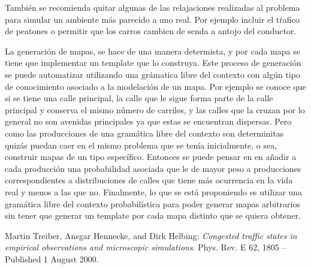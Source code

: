 \documentclass[colorinlistoftodos,twoside,twocolumn]{article} %
\begin{document}
	Tambi\'en se recomienda quitar algunas de las relajaciones realizadas al problema para simular un ambiente m\'as parecido  a uno real. Por ejemplo incluir el t\'rafico de peatones o permitir que los carros cambien de senda a antojo del conductor.
	
La generación de mapas, se hace de una manera determista, y por cada mapa se tiene que implementar un template que lo construya. Este proceso de generación se puede automatizar utilizando una grámatica libre del contexto con algún tipo de conocimiento asociado a la modelación de un mapa. Por ejemplo se conoce que si se tiene una calle principal, la calle que le sigue forma parte de la calle principal y conserva el mismo número de carriles, y las calles que la cruzan por lo general no son avenidas principales ya que estas se encuentran dispersas. Pero como las producciones de una gramática libre del contexto son determinitas quizás puedan caer en el mismo problema que se tenía inicialmente, o sea, construir mapas de un tipo específico. Entonces se puede pensar en en a\~nadir a cada producción una probabilidad asociada que le de mayor peso a producciones correspondientes a distribuciones de calles que tiene m\'as ocurrencia en la vida real y menos a las que no. Finalmente, lo que se está proponiendo es utilizar una gramática libre del contexto probabilística para poder generar mapas arbitrarios sin tener que generar un template por cada mapa distinto que se quiera obtener.

	\listoftodos

\begin{thebibliography}{20}
	 Martin Treiber, Ansgar Hennecke, and Dirk Helbing: \emph{Congested traffic states in empirical observations and microscopic simulations}. Phys. Rev. E 62, 1805 – Published 1 August 2000.
\end{thebibliography}
\end{document}
